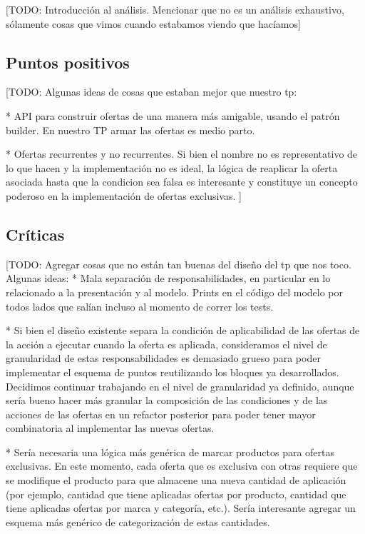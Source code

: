 \documentclass[a4paper,11pt]{article}
\begin{document}
[TODO: Introducción al análisis. Mencionar que no es un análisis exhaustivo,
sólamente cosas que vimos cuando estabamos viendo que hacíamos]

\subsection{Puntos positivos}

[TODO: Algunas ideas de cosas que estaban mejor que nuestro tp:

  * API para construir ofertas de una manera más amigable, usando el patrón
  builder. En nuestro TP armar las ofertas es medio parto.

  * Ofertas recurrentes y no recurrentes. Si bien el nombre no es
  representativo de lo que hacen y la implementación no es ideal, la lógica
  de reaplicar la oferta asociada hasta que la condicion sea falsa es interesante
  y constituye un concepto poderoso en la implementación de ofertas exclusivas.
]

\subsection{Críticas}

[TODO: Agregar cosas que no están tan buenas del diseño del tp que nos toco. Algunas ideas:
  * Mala separación de responsabilidades, en particular en lo relacionado a
  la presentación y al modelo. Prints en el código del modelo por todos
  lados que salían incluso al momento de correr los tests.

  * Si bien el diseño existente separa la condición de aplicabilidad de las
  ofertas de la acción a ejecutar cuando la oferta es aplicada,
  consideramos el nivel de granularidad de estas responsabilidades es demasiado
  grueso para poder implementar el esquema de puntos reutilizando los bloques ya
  desarrollados. Decidimos continuar trabajando en el nivel de granularidad ya
  definido, aunque sería bueno hacer más granular la composición de las
  condiciones y de las acciones de las ofertas en un refactor posterior para
  poder tener mayor combinatoria al implementar las nuevas ofertas.

  * Sería necesaria una lógica más genérica de marcar productos para ofertas
  exclusivas. En este momento, cada oferta que es exclusiva con otras
  requiere que se modifique el producto para que almacene una nueva cantidad de
  aplicación (por ejemplo, cantidad que tiene aplicadas ofertas por producto,
  cantidad que tiene aplicadas ofertas por marca y categoría, etc.). Sería
  interesante agregar un esquema más genérico de categorización de estas
  cantidades.
\end{document}
